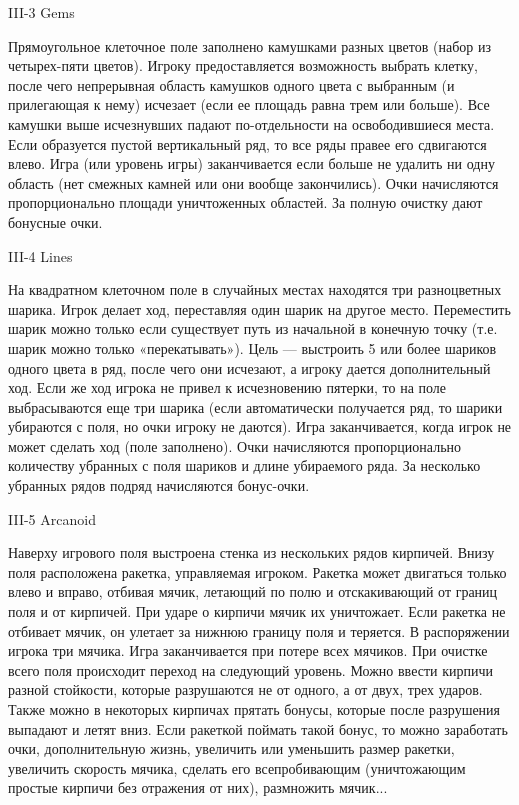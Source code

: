 III-3 Gems

Прямоугольное клеточное поле заполнено камушками разных цветов (набор из
четырех-пяти цветов). Игроку предоставляется возможность выбрать клетку, после
чего непрерывная область камушков одного цвета с выбранным (и прилегающая к
нему) исчезает (если ее площадь равна трем или больше). Все камушки выше
исчезнувших падают по-отдельности на освободившиеся места. Если образуется
пустой вертикальный ряд, то все ряды правее его сдвигаются влево. Игра (или
уровень игры) заканчивается если больше не удалить ни одну область (нет
смежных камней или они вообще закончились). Очки начисляются пропорционально
площади уничтоженных областей. За полную очистку дают бонусные очки.


III-4 Lines

На квадратном клеточном поле в случайных местах находятся три разноцветных
шарика. Игрок делает ход, переставляя один шарик на другое место. Переместить
шарик можно только если существует путь из начальной в конечную точку (т.е.
шарик можно только «перекатывать»). Цель — выстроить 5 или более шариков
одного цвета в ряд, после чего они исчезают, а игроку дается дополнительный
ход. Если же ход игрока не привел к исчезновению пятерки, то на поле
выбрасываются еще три шарика (если автоматически получается ряд, то шарики
убираются с поля, но очки игроку не даются). Игра заканчивается, когда игрок
не может сделать ход (поле заполнено). Очки начисляются пропорционально
количеству убранных с поля шариков и длине убираемого ряда. За несколько
убранных рядов подряд начисляются бонус-очки.


III-5 Arcanoid

Наверху игрового поля выстроена стенка из нескольких рядов кирпичей. Внизу
поля расположена ракетка, управляемая игроком. Ракетка может двигаться только
влево и вправо, отбивая мячик, летающий по полю и отскакивающий от границ поля
и от кирпичей. При ударе о кирпичи мячик их уничтожает. Если ракетка не
отбивает мячик, он улетает за нижнюю границу поля и теряется. В распоряжении
игрока три мячика. Игра заканчивается при потере всех мячиков. При очистке
всего поля происходит переход на следующий уровень. Можно ввести кирпичи
разной стойкости, которые разрушаются не от одного, а от двух, трех ударов.
Также можно в некоторых кирпичах прятать бонусы, которые после разрушения
выпадают и летят вниз. Если ракеткой поймать такой бонус, то можно заработать
очки, дополнительную жизнь, увеличить или уменьшить размер ракетки, увеличить
скорость мячика, сделать его всепробивающим (уничтожающим простые кирпичи без
отражения от них), размножить мячик...

